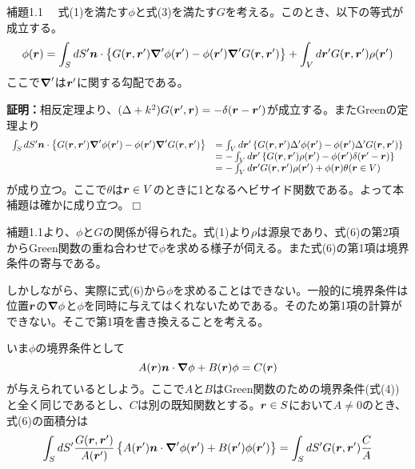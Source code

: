 \documentclass[dvipdfmx, 9pt, a4paper]{jsarticle}
\newcommand{\bm}[1]{{\mbox{\boldmath $#1$}}}
\newcommand{\bnabla}{\bm \nabla}
\def\qed{\hfill $\Box$}
\begin{document}
\begin{itembox}[l]{補題1.1}
　式(1)を満たす$\phi$と式(3)を満たす$G$を考える。このとき、以下の等式が成立する。
\begin{equation}
\phi(\bm r)=\int_S dS' \bm n \cdot \left\{ G(\bm r, \bm r')\bnabla' \phi(\bm r')-\phi(\bm r')\bnabla'G(\bm r, \bm r') \right\}+\int_Vd\bm r'G(\bm r, \bm r')\rho(\bm r')
\end{equation}
ここで$\bnabla'$は$\bm r'$に関する勾配である。
\end{itembox}
{\bf 証明：}相反定理より、$(\Delta + k^2)G(\bm r', \bm r)=-\delta(\bm r-\bm r')$が成立する。またGreenの定理より
\begin{equation}
\begin{array}{ll}
\int_S dS' \bm n \cdot \left\{ G(\bm r, \bm r')\bnabla' \phi(\bm r')-\phi(\bm r')\bnabla'G(\bm r, \bm r') \right\} &=\int_V d\bm r'\left\{ G(\bm r, \bm r')\Delta'\phi(\bm r')-\phi(\bm r')\Delta'G(\bm r, \bm r') \right\} \\
 & = -\int_Vd\bm r'\left\{ G(\bm r, \bm r')\rho(\bm r')-\phi(\bm r')\delta(\bm r'-\bm r) \right\} \\
 & = -\int_V d\bm r'G(\bm r, \bm r')\rho(\bm r')+\phi(\bm r)\theta(\bm r \in V)
\end{array} \notag
\end{equation}
が成り立つ。ここで$\theta$は$\bm r \in V$のときに1となるヘビサイド関数である。よって本補題は確かに成り立つ。\qed \par
補題1.1より、$\phi$と$G$の関係が得られた。式(1)より$\rho$は源泉であり、式(6)の第2項からGreen関数の重ね合わせで$\phi$を求める様子が伺える。また式(6)の第1項は境界条件の寄与である。\par
しかしながら、実際に式(6)から$\phi$を求めることはできない。一般的に境界条件は位置$\bm r$の$\bnabla \phi$と$\phi$を同時に与えてはくれないためである。そのため第1項の計算ができない。そこで第1項を書き換えることを考える。\par
いま$\phi$の境界条件として
\begin{equation}
A(\bm r)\bm n\cdot \bm \nabla \phi+B(\bm r)\phi=C(\bm r)
\end{equation}
が与えられているとしよう。ここで$A$と$B$はGreen関数のための境界条件(式(4))と全く同じであるとし、$C$は別の既知関数とする。$\bm r \in S$において$A \neq 0$のとき、式(6)の面積分は
\begin{equation}
\int_S dS' \frac{G(\bm r, \bm r')}{A(\bm r')} \left\{A(\bm r')\bm n \cdot \bnabla' \phi(\bm r')+B(\bm r')\phi(\bm r') \right\}=\int_S dS' G(\bm r, \bm r')\frac{C}{A} \notag
\end{equation}
\end{document}
